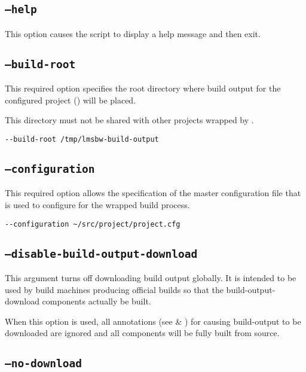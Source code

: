 \subsection{\texttt{--help}}

This option causes the script to display a help message and then exit.

\subsection{\texttt{--build-root}}\label{usinglmsbw:build-root}

This required option specifies the root directory where build output
for the configured project () will be
placed.

This directory must not be shared with other projects wrapped by
\lmsbw.

\begin{verbatim}
--build-root /tmp/lmsbw-build-output
\end{verbatim}

\subsection{\texttt{--configuration}}\label{usinglmsbw:configuration}

This required option allows the specification of the master
configuration file that is used to configure \lmsbw for the wrapped
build process.

\begin{verbatim}
--configuration ~/src/project/project.cfg
\end{verbatim}


\subsection{\texttt{--disable-build-output-download}}
\label{usinglmsbw:disable-build-output-download}

This argument turns off downloading build output globally.  It is
intended to be used by build machines producing official builds so
that the build-output-download components actually be built.

When this option is used, all annotations (see
 \&
) for causing build-output to be
downloaded are ignored and all components will be fully built from
source.

\subsection{\texttt{--no-download}}\label{usinglmsbw:no-download}


